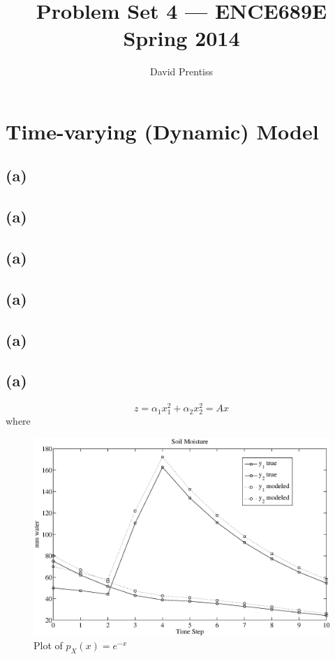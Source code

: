 \documentclass[fleqn, letterpaper]{tufte-handout}
\title{Problem Set 4 --- ENCE689E Spring 2014}
\author{David Prentiss}
\begin{document}
\maketitle

\section{Time-varying (Dynamic) Model}
\subsection{(a)}
\subsection{(a)}
\subsection{(a)}
\subsection{(a)}
\subsection{(a)}
\subsection{(a)}
\[z = \alpha_1x_1^2+\alpha_2x_2^2 = Ax\]
where 
\begin{figure}
        \includegraphics[width=\textwidth]{ps5figb}
        \caption{Plot of $p_X(x)=e^{-x}$}
        \label{exprnd}
\end{figure}

{\small
\begin{minipage}{\linewidth}
        
\end{minipage}
}
\end{document}
